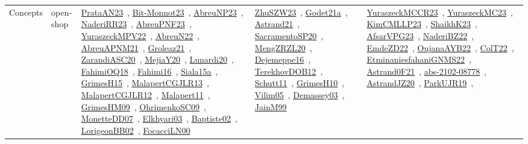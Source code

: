 {\begin{longtable}{lp{3cm}>{\raggedright\arraybackslash}p{6cm}>{\raggedright\arraybackslash}p{6cm}>{\raggedright\arraybackslash}p{8cm}}
Concepts & open-shop & \href{works/PrataAN23.pdf}{PrataAN23}~\cite{PrataAN23}, \href{works/Bit-Monnot23.pdf}{Bit-Monnot23}~\cite{Bit-Monnot23}, \href{works/AbreuNP23.pdf}{AbreuNP23}~\cite{AbreuNP23}, \href{works/NaderiRR23.pdf}{NaderiRR23}~\cite{NaderiRR23}, \href{works/AbreuPNF23.pdf}{AbreuPNF23}~\cite{AbreuPNF23}, \href{works/YuraszeckMPV22.pdf}{YuraszeckMPV22}~\cite{YuraszeckMPV22}, \href{works/AbreuN22.pdf}{AbreuN22}~\cite{AbreuN22}, \href{works/AbreuAPNM21.pdf}{AbreuAPNM21}~\cite{AbreuAPNM21}, \href{works/Groleaz21.pdf}{Groleaz21}~\cite{Groleaz21}, \href{works/ZarandiASC20.pdf}{ZarandiASC20}~\cite{ZarandiASC20}, \href{works/MejiaY20.pdf}{MejiaY20}~\cite{MejiaY20}, \href{works/Lunardi20.pdf}{Lunardi20}~\cite{Lunardi20}, \href{works/FahimiOQ18.pdf}{FahimiOQ18}~\cite{FahimiOQ18}, \href{works/Fahimi16.pdf}{Fahimi16}~\cite{Fahimi16}, \href{works/Siala15a.pdf}{Siala15a}~\cite{Siala15a}, \href{works/GrimesH15.pdf}{GrimesH15}~\cite{GrimesH15}, \href{works/MalapertCGJLR13.pdf}{MalapertCGJLR13}~\cite{MalapertCGJLR13}, \href{works/MalapertCGJLR12.pdf}{MalapertCGJLR12}~\cite{MalapertCGJLR12}, \href{works/Malapert11.pdf}{Malapert11}~\cite{Malapert11}, \href{works/GrimesHM09.pdf}{GrimesHM09}~\cite{GrimesHM09}, \href{works/OhrimenkoSC09.pdf}{OhrimenkoSC09}~\cite{OhrimenkoSC09}, \href{works/MonetteDD07.pdf}{MonetteDD07}~\cite{MonetteDD07}, \href{works/Elkhyari03.pdf}{Elkhyari03}~\cite{Elkhyari03}, \href{works/Baptiste02.pdf}{Baptiste02}~\cite{Baptiste02}, \href{works/LorigeonBB02.pdf}{LorigeonBB02}~\cite{LorigeonBB02}, \href{works/FocacciLN00.pdf}{FocacciLN00}~\cite{FocacciLN00} & \href{works/ZhuSZW23.pdf}{ZhuSZW23}~\cite{ZhuSZW23}, \href{works/Godet21a.pdf}{Godet21a}~\cite{Godet21a}, \href{works/Astrand21.pdf}{Astrand21}~\cite{Astrand21}, \href{works/SacramentoSP20.pdf}{SacramentoSP20}~\cite{SacramentoSP20}, \href{works/MengZRZL20.pdf}{MengZRZL20}~\cite{MengZRZL20}, \href{works/Dejemeppe16.pdf}{Dejemeppe16}~\cite{Dejemeppe16}, \href{works/TerekhovDOB12.pdf}{TerekhovDOB12}~\cite{TerekhovDOB12}, \href{works/Schutt11.pdf}{Schutt11}~\cite{Schutt11}, \href{works/GrimesH10.pdf}{GrimesH10}~\cite{GrimesH10}, \href{works/Vilim05.pdf}{Vilim05}~\cite{Vilim05}, \href{works/Demassey03.pdf}{Demassey03}~\cite{Demassey03}, \href{works/JainM99.pdf}{JainM99}~\cite{JainM99} & \href{works/YuraszeckMCCR23.pdf}{YuraszeckMCCR23}~\cite{YuraszeckMCCR23}, \href{works/YuraszeckMC23.pdf}{YuraszeckMC23}~\cite{YuraszeckMC23}, \href{works/KimCMLLP23.pdf}{KimCMLLP23}~\cite{KimCMLLP23}, \href{works/ShaikhK23.pdf}{ShaikhK23}~\cite{ShaikhK23}, \href{works/AfsarVPG23.pdf}{AfsarVPG23}~\cite{AfsarVPG23}, \href{works/NaderiBZ22.pdf}{NaderiBZ22}~\cite{NaderiBZ22}, \href{works/EmdeZD22.pdf}{EmdeZD22}~\cite{EmdeZD22}, \href{works/OujanaAYB22.pdf}{OujanaAYB22}~\cite{OujanaAYB22}, \href{works/ColT22.pdf}{ColT22}~\cite{ColT22}, \href{works/EtminaniesfahaniGNMS22.pdf}{EtminaniesfahaniGNMS22}~\cite{EtminaniesfahaniGNMS22}, \href{works/Astrand0F21.pdf}{Astrand0F21}~\cite{Astrand0F21}, \href{works/abs-2102-08778.pdf}{abs-2102-08778}~\cite{abs-2102-08778}, \href{works/AstrandJZ20.pdf}{AstrandJZ20}~\cite{AstrandJZ20}, \href{works/ParkUJR19.pdf}{ParkUJR19}~\cite{ParkUJR19}, 
\end{longtable}}
